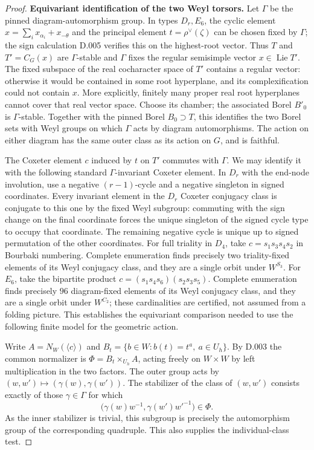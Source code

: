 \begin{proof}
\medskip\noindent\textbf{Equivariant identification of the two Weyl torsors.}
Let $\Gamma$ be the pinned diagram-automorphism group.
In types $D_r,E_6$, the cyclic element
$x=\sum_i x_{\alpha_i}+x_{-\theta}$ and the principal element
$t=\rho^\vee(\zeta)$ can be chosen fixed by $\Gamma$; the sign
calculation D.005 verifies this on the highest-root vector.
Thus $T$ and $T'=C_G(x)$ are $\Gamma$-stable and $\Gamma$ fixes
the regular semisimple vector $x\in\operatorname{Lie}T'$.
The fixed subspace of the real cocharacter space of $T'$ contains
a regular vector: otherwise it would be contained in some root
hyperplane, and its complexification could not contain $x$.
More explicitly, finitely many proper real root hyperplanes
cannot cover that real vector space.  Choose its chamber;
the associated Borel $B'_0$ is $\Gamma$-stable.
Together with the pinned Borel $B_0\supset T$, this identifies
the two Borel sets with Weyl groups on which $\Gamma$ acts by
diagram automorphisms.  The action on either diagram has the
same outer class as its action on $G$, and is faithful.

The Coxeter element $c$ induced by $t$ on $T'$ commutes with
$\Gamma$.  We may identify it with the following standard
$\Gamma$-invariant Coxeter element.  In $D_r$ with the end-node
involution, use a negative $(r-1)$-cycle and a negative singleton
in signed coordinates.  Every invariant element in the $D_r$
Coxeter conjugacy class is conjugate to this one by the fixed
Weyl subgroup: commuting with the sign change on the final
coordinate forces the unique singleton of the signed cycle type
to occupy that coordinate.  The remaining negative cycle is
unique up to signed permutation of the other coordinates.
For full triality in $D_4$, take
$c=s_1s_3s_4s_2$ in Bourbaki numbering.  Complete enumeration
finds precisely two triality-fixed elements of its Weyl conjugacy
class, and they are a single orbit under $W^{S_3}$.
For $E_6$, take the bipartite product
$c=(s_1s_4s_6)(s_2s_3s_5)$.
Complete enumeration finds precisely $96$ diagram-fixed elements
of its Weyl conjugacy class, and they are a single orbit under
$W^{C_2}$; these cardinalities are certified, not assumed from
a folding picture.  This establishes the equivariant comparison
needed to use the following finite model for the geometric action.

Write $A=N_W(\langle c\rangle)$ and
$B_t=\{b\in W:b(t)=t^a,\ a\in U_h\}$.
By D.003 the common normalizer is
$\Phi=B_t\times_{U_h}A$, acting freely on $W\times W$ by
left multiplication in the two factors.  The outer group acts
by $(w,w')\mapsto(\gamma(w),\gamma(w'))$.
The stabilizer of the class of $(w,w')$ consists exactly of
those $\gamma\in\Gamma$ for which
\[
 \bigl(\gamma(w)w^{-1},\gamma(w')w'^{-1}\bigr)\in\Phi.
                                                               \tag{D26.1}
\]
As the inner stabilizer is trivial, this subgroup is precisely
the automorphism group of the corresponding quadruple.
This also supplies the individual-class test.


\end{proof}
